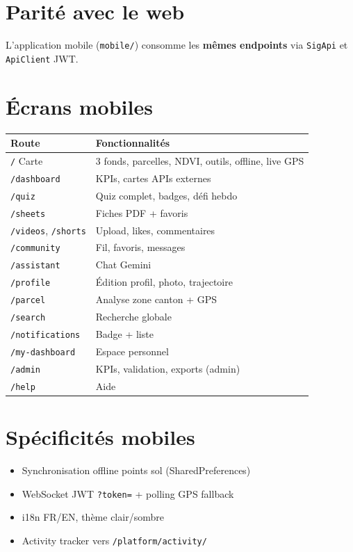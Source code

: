 \documentclass[11pt,a4paper]{report}
\begin{document}
\section{Parité avec le web}
L'application mobile (\texttt{mobile/}) consomme les \textbf{mêmes endpoints} via \texttt{SigApi} et \texttt{ApiClient} JWT.

\section{Écrans mobiles}
\begin{tabularx}{\textwidth}{@{}ll@{}}
\toprule
\textbf{Route} & \textbf{Fonctionnalités} \\
\midrule
\texttt{/} Carte & 3 fonds, parcelles, NDVI, outils, offline, live GPS \\
\texttt{/dashboard} & KPIs, cartes APIs externes \\
\texttt{/quiz} & Quiz complet, badges, défi hebdo \\
\texttt{/sheets} & Fiches PDF + favoris \\
\texttt{/videos}, \texttt{/shorts} & Upload, likes, commentaires \\
\texttt{/community} & Fil, favoris, messages \\
\texttt{/assistant} & Chat Gemini \\
\texttt{/profile} & Édition profil, photo, trajectoire \\
\texttt{/parcel} & Analyse zone canton + GPS \\
\texttt{/search} & Recherche globale \\
\texttt{/notifications} & Badge + liste \\
\texttt{/my-dashboard} & Espace personnel \\
\texttt{/admin} & KPIs, validation, exports (admin) \\
\texttt{/help} & Aide \\
\bottomrule
\end{tabularx}

\section{Spécificités mobiles}
\begin{itemize}[leftmargin=*]
  \item Synchronisation offline points sol (SharedPreferences)
  \item WebSocket JWT \texttt{?token=} + polling GPS fallback
  \item i18n FR/EN, thème clair/sombre
  \item Activity tracker vers \texttt{/platform/activity/}
\end{itemize}
\end{document}
